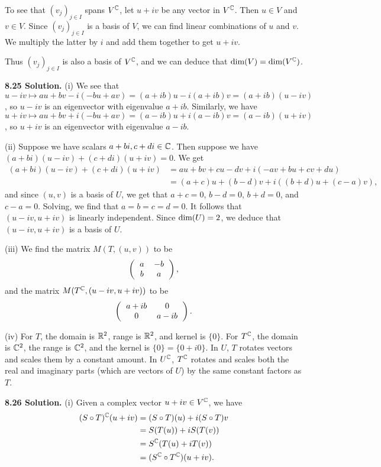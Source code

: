 To see that $(v_j)_{j \in I}$ spans $V^{\mathbb{C}}$, let $u + iv$ be any vector in $V^{\mathbb{C}}$. Then $u \in V$ and $v \in V$. Since $(v_j)_{j \in I}$ is a basis of $V$, we can find linear combinations of $u$ and $v$. We multiply the latter by $i$ and add them together to get $u + iv$.

Thus $(v_j)_{j \in I}$ is also a basis of $V^{\mathbb{C}}$, and we can deduce that $\text{dim}(V) = \text{dim}(V^{\mathbb{C}})$.

\textbf{8.25 Solution.} (i) We see that $u - iv \mapsto au + bv - i(-bu + av) = (a + ib)u - i(a + ib)v = (a + ib)(u - iv)$, so $u - iv$ is an eigenvector with eigenvalue $a + ib$. Similarly, we have $u + iv \mapsto au + bv + i(-bu + av) = (a - ib)u + i(a - ib)v = (a - ib)(u + iv)$, so $u + iv$ is an eigenvector with eigenvalue $a - ib$.

(ii) Suppose we have scalars $a+bi, c+di \in \mathbb{C}$. Then suppose we have $(a + bi)(u - iv) + (c + di)(u + iv) = 0$. We get
\begin{align*}
    (a + bi)(u - iv) + (c + di)(u + iv) &= au + bv + cu - dv + i(-av + bu + cv + du) \\
        &= (a + c)u + (b - d)v + i((b + d)u + (c - a)v),
\end{align*}
and since $(u, v)$ is a basis of $U$, we get that $a + c = 0$, $b - d = 0$, $b + d = 0$, and $c - a = 0$. Solving, we find that $a = b = c = d = 0$. It follows that $(u - iv, u + iv)$ is linearly independent. Since $\text{dim}(U) = 2$, we deduce that $(u - iv, u + iv)$ is a basis of $U$.

(iii) We find the matrix $M(T, (u,v))$ to be
\[\left(\begin{tabular}{cc}
    $a$ & $-b$ \\
    $b$ & $a$
\end{tabular}\right),\]
and the matrix $M(T^{\mathbb{C}}, (u - iv, u + iv))$ to be
\[\left(\begin{tabular}{cc}
    $a + ib$ & 0 \\
    0 & $a - ib$
\end{tabular}\right).\]

(iv) For $T$, the domain is $\mathbb{R}^2$, range is $\mathbb{R}^2$, and kernel is $\{0\}$. For $T^{\mathbb{C}}$, the domain is $\mathbb{C}^2$, the range is $\mathbb{C}^2$, and the kernel is $\{0\} = \{0 + i0\}$. In $U$, $T$ rotates vectors and scales them by a constant amount. In $U^{\mathbb{C}}$, $T^{\mathbb{C}}$ rotates and scales both the real and imaginary parts (which are vectors of $U$) by the same constant factors as $T$.

\textbf{8.26 Solution.} (i) Given a complex vector $u + iv \in V^{\mathbb{C}}$, we have
\begin{align*}
    (S \circ T)^{\mathbb{C}}(u + iv) &= (S \circ T)(u) + i(S \circ T)v \\
        &= S(T(u)) + iS(T(v)) \\
        &= S^{\mathbb{C}}(T(u) + iT(v)) \\
        &= (S^{\mathbb{C}} \circ T^{\mathbb{C}})(u + iv).
\end{align*}

